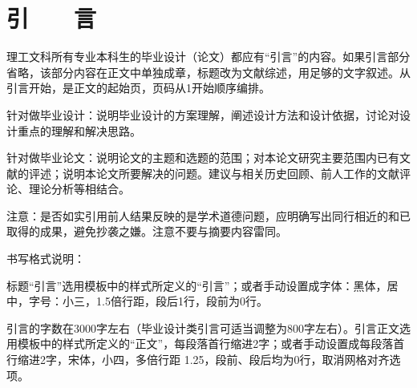 
\chapter*{\hfill 引　　言 \hfill}
{}
\label{chap00}
理工文科所有专业本科生的毕业设计（论文）都应有“引言”的内容。如果引言部分省略，该部分内容在正文中单独成章，标题改为文献综述，用足够的文字叙述。从引言开始，是正文的起始页，页码从1开始顺序编排。

针对做毕业设计：说明毕业设计的方案理解，阐述设计方法和设计依据，讨论对设计重点的理解和解决思路。

针对做毕业论文：说明论文的主题和选题的范围；对本论文研究主要范围内已有文献的评述；说明本论文所要解决的问题。建议与相关历史回顾、前人工作的文献评论、理论分析等相结合。

注意：是否如实引用前人结果反映的是学术道德问题，应明确写出同行相近的和已取得的成果，避免抄袭之嫌。注意不要与摘要内容雷同。

书写格式说明：

标题“引言”选用模板中的样式所定义的“引言”；或者手动设置成字体：黑体，居中，字号：小三，1.5倍行距，段后1行，段前为0行。

引言的字数在3000字左右（毕业设计类引言可适当调整为800字左右）。引言正文选用模板中的样式所定义的“正文”，每段落首行缩进2字；或者手动设置成每段落首行缩进2字，宋体，小四，多倍行距 1.25，段前、段后均为0行，取消网格对齐选项。


